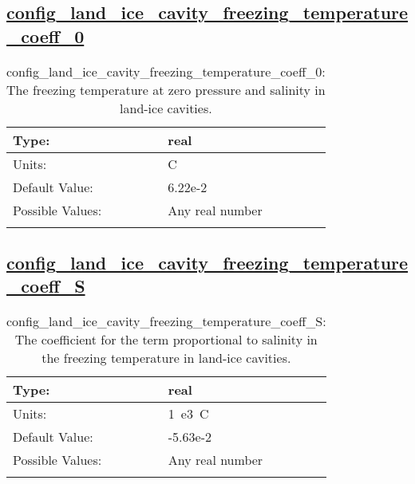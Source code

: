 \subsection[config\_land\_ice\_cavity\_freezing\_temperature\_coeff\_0]{\hyperref[sec:nm_tab_eos]{config\_land\_ice\_cavity\_freezing\_temperature\_coeff\_0}}
\label{subsec:nm_sec_config_land_ice_cavity_freezing_temperature_coeff_0}
\begin{center}
\begin{longtable}{| p{2.0in} || p{4.0in} |}
    \hline
    Type: & real \\
    \hline
    Units: & \si{C} \\
    \hline
    Default Value: & 6.22e-2 \\
    \hline
    Possible Values: & Any real number \\
    \hline
    \caption{config\_land\_ice\_cavity\_freezing\_temperature\_coeff\_0: The freezing temperature at zero pressure and salinity in land-ice cavities.}
\end{longtable}
\end{center}
\subsection[config\_land\_ice\_cavity\_freezing\_temperature\_coeff\_S]{\hyperref[sec:nm_tab_eos]{config\_land\_ice\_cavity\_freezing\_temperature\_coeff\_S}}
\label{subsec:nm_sec_config_land_ice_cavity_freezing_temperature_coeff_S}
\begin{center}
\begin{longtable}{| p{2.0in} || p{4.0in} |}
    \hline
    Type: & real \\
    \hline
    Units: & \si{1.e3.C} \\
    \hline
    Default Value: & -5.63e-2 \\
    \hline
    Possible Values: & Any real number \\
    \hline
    \caption{config\_land\_ice\_cavity\_freezing\_temperature\_coeff\_S: The coefficient for the term proportional to salinity in the freezing temperature in land-ice cavities.}
\end{longtable}
\end{center}

